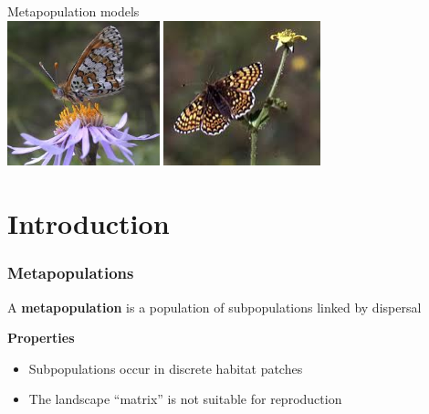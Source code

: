 \documentclass[color=usenames,dvipsnames]{beamer}\usepackage[]{graphicx}\usepackage[]{color}
\begin{document}
\begin{frame}[plain]
  \begin{center}
    {\huge Metapopulation models \\}
    \vfill
      \includegraphics[height=4.2cm,keepaspectratio]{figs/frit} \hspace{0.5cm}
      \includegraphics[height=4.2cm,keepaspectratio]{figs/frit2}
  \end{center}
\end{frame}



\section{Introduction}


\begin{frame}
  \frametitle{Metapopulations}
  \large
  \begin{center} \Large
    A {\color{TealBlue}
      \bf metapopulation} is a population of
    subpopulations linked by dispersal
  \end{center}
  \pause
  {\bf Properties}
  \begin{itemize}
    \item Subpopulations occur in discrete habitat patches
    \item The landscape ``matrix'' is not suitable for reproduction
  \end{itemize}
\end{frame}
\end{document}
